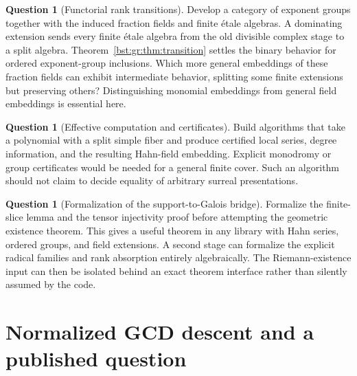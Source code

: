 \documentclass[11pt,letterpaper]{article}
\theoremstyle{definition}
\newtheorem{question}[theorem]{Question}
\theoremstyle{remark}
\newcounter{bstgrsavedequation}
\begin{document}
\begin{question}[Functorial rank transitions]\label{bst:gr:q:functorial}
Develop a category of exponent groups together with the induced fraction
fields and finite \'etale algebras. A dominating extension sends every finite
\'etale algebra from the old divisible complex stage to a split algebra.
Theorem~\ref{bst:gr:thm:transition} settles the binary behavior for ordered
exponent-group inclusions. Which more general embeddings of these fraction
fields can exhibit intermediate behavior, splitting some finite extensions but
preserving others? Distinguishing monomial embeddings from general field
embeddings is essential here.
\end{question}

\begin{question}[Effective computation and certificates]\label{bst:gr:q:effective}
Build algorithms that take a polynomial with a split simple fiber and produce
certified local series, degree information, and the resulting Hahn-field
embedding. Explicit monodromy or group certificates would be needed for a
general finite cover. Such an algorithm should not claim to decide equality of
arbitrary surreal presentations.
\end{question}

\begin{question}[Formalization of the support-to-Galois bridge]\label{bst:gr:q:formal}
Formalize the finite-slice lemma and the tensor injectivity proof before
attempting the geometric existence theorem. This gives a useful theorem in any
library with Hahn series, ordered groups, and field extensions. A second stage
can formalize the explicit radical families and rank absorption entirely
algebraically. The Riemann-existence input can then be isolated behind an
exact theorem interface rather than silently assumed by the code.
\end{question}

\setcounter{equation}{\value{bstgrsavedequation}}
\let\theequation\bstgrsavedtheequation
\let\theHequation\bstgrsavedtheHequation

\appendix
\section{Normalized GCD descent and a published question}\label{bst:sec:gcd}
\end{document}
